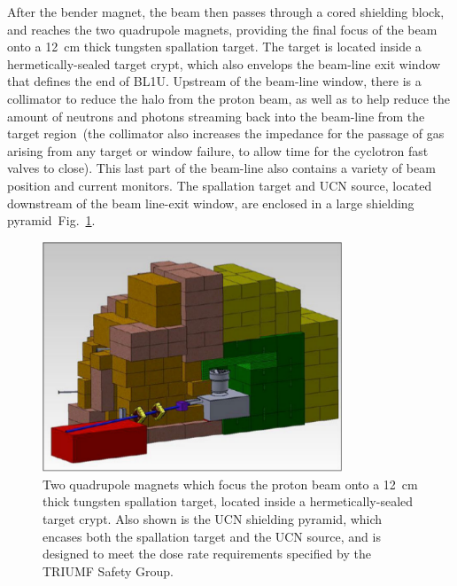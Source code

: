 After the bender magnet, the beam then passes through a cored
shielding block, and reaches the two quadrupole magnets, providing the
final focus of the beam onto a 12~cm thick tungsten spallation target.
The target is located inside a hermetically-sealed target crypt, which
also envelops the beam-line exit window that defines the end of BL1U.
Upstream of the beam-line window, there is a collimator to reduce the
halo from the proton beam, as well as to help reduce the amount of
neutrons and photons streaming back into the beam-line from the target
region~(the collimator also increases the impedance for the passage of
gas arising from any target or window failure, to allow time for the
cyclotron fast valves to close). This last part of the beam-line also
contains a variety of beam position and current monitors. The
spallation target and UCN source, located downstream of the beam
line-exit window, are enclosed in a large shielding
pyramid~Fig.~\ref{fig:pyramid}.
\begin{figure}[h!]
  \centering
  \includegraphics[width=0.8\textwidth]{pyramid.png}
  \caption{Two quadrupole magnets which focus the proton beam onto a
    12~cm thick tungsten spallation target, located inside a
    hermetically-sealed target crypt. Also shown is the UCN shielding
    pyramid, which encases both the spallation target and the UCN
    source, and is designed to meet the dose rate requirements
    specified by the TRIUMF Safety Group.}
  \label{fig:pyramid}
\end{figure}

